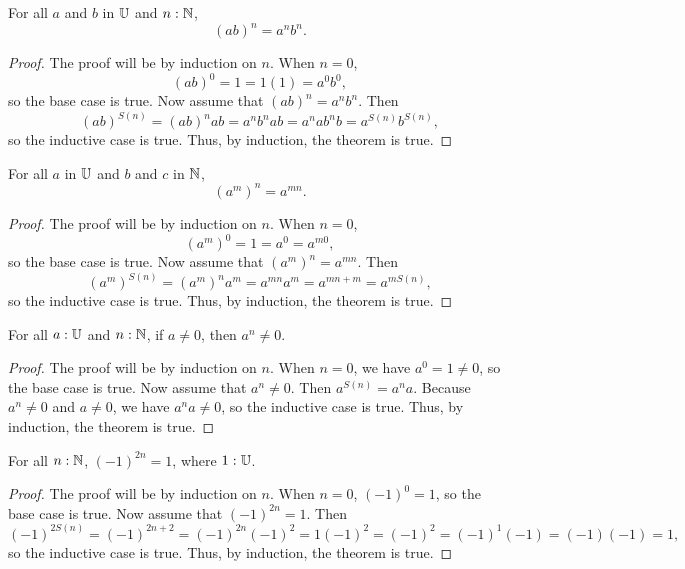 \documentclass[../math.tex]{subfiles}
\begin{document}
\begin{theorem}
    For all $a$ and $b$ in $\mathbb{U}$ and $n : \mathbb{N}$,
    \[
        (ab)^n = a^nb^n.
    \]
\end{theorem}
\begin{proof}
    The proof will be by induction on $n$.  When $n = 0$,
    \[
        (ab)^0 = 1 = 1(1) = a^0b^0,
    \]
    so the base case is true.  Now assume that $(ab)^n = a^nb^n$.  Then
    \[
        (ab)^{S(n)} = (ab)^n ab = a^n b^n a b = a^n a b^n b = a^{S(n)} b^{S(n)},
    \]
    so the inductive case is true.  Thus, by induction, the theorem is true.
\end{proof}

\begin{theorem}
    For all $a$ in $\mathbb{U}$ and $b$ and $c$ in $\mathbb{N}$,
    \[
        (a^m)^n = a^{mn}.
    \]
\end{theorem}
\begin{proof}
    The proof will be by induction on $n$.  When $n = 0$,
    \[
        (a^m)^0 = 1 = a^0 = a^{m0},
    \]
    so the base case is true.  Now assume that $(a^m)^n = a^{mn}$.  Then
    \[
        (a^m)^{S(n)} = (a^m)^n a^m = a^{mn} a^m = a^{mn + m} = a^{mS(n)},
    \]
    so the inductive case is true.  Thus, by induction, the theorem is true.
\end{proof}

\begin{theorem} \label{nat_pow_not_zero}
    For all $a : \mathbb{U}$ and $n : \mathbb{N}$, if $a \neq 0$, then $a^n \neq 0$.
\end{theorem}
\begin{proof}
    The proof will be by induction on $n$.  When $n = 0$, we have $a^0 = 1 \neq
    0$, so the base case is true.  Now assume that $a^n \neq 0$.  Then $a^{S(n)}
    = a^na.$  Because $a^n \neq 0$ and $a \neq 0$, we have $a^na \neq 0$, so the
    inductive case is true.  Thus, by induction, the theorem is true.
\end{proof}

\begin{theorem} \label{nat_pow_neg_even}
    For all $n : \mathbb{N}$, $(-1)^{2n} = 1$, where $1 : \mathbb{U}$.
\end{theorem}
\begin{proof}
    The proof will be by induction on $n$.  When $n = 0$, $(-1)^0 = 1$, so the
    base case is true.  Now assume that $(-1)^{2n} = 1$.  Then
    \[
        (-1)^{2S(n)} = (-1)^{2n + 2} = (-1)^{2n} (-1)^2 = 1 (-1)^2 = (-1)^2 =
        (-1)^1 (-1) = (-1) (-1) = 1,
    \]
    so the inductive case is true.  Thus, by induction, the theorem is true.
\end{proof}
\end{document}
